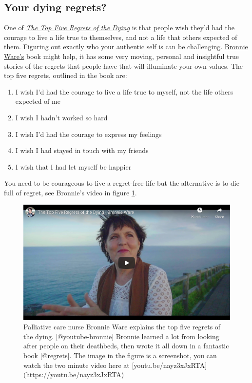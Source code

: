 \documentclass[
]{book}
\providecommand{\tightlist}{%
  \setlength{\itemsep}{0pt}\setlength{\parskip}{0pt}}
\begin{document}
\hypertarget{regret}{%
\subsection{Your dying regrets?}\label{regret}}

One of \emph{\href{https://en.wikipedia.org/wiki/The_Top_Five_Regrets_of_the_Dying}{The Top Five Regrets of the Dying}} \citep{regrets} is that people wish they'd had the courage to live a life true to themselves, and not a life that others expected of them. Figuring out exactly who your authentic self is can be challenging. \href{https://en.wikipedia.org/wiki/Bronnie_Ware}{Bronnie Ware's} book might help, it has some very moving, personal and insightful true stories of the regrets that people have that will illuminate your own values. The top five regrets, outlined in the book are:

\begin{enumerate}
\def\labelenumi{\arabic{enumi}.}
\tightlist
\item
  I wish I'd had the courage to live a life true to myself, not the life others expected of me
\item
  I wish I hadn't worked so hard
\item
  I wish I'd had the courage to express my feelings
\item
  I wish I had stayed in touch with my friends
\item
  I wish that I had let myself be happier
\end{enumerate}

You need to be courageous to live a regret-free life but the alternative is to die full of regret, see Bronnie's video in figure \ref{fig:bronnie-fig}.

\begin{figure}

{\centering \includegraphics[width=0.99\linewidth]{images/youtube-bronnie} 

}

\caption{Palliative care nurse Bronnie Ware explains the top five regrets of the dying. [@youtube-bronnie] Bronnie learned a lot from looking after people on their deathbeds, then wrote it all down in a fantastic book [@regrets]. The image in the figure is a screenshot, you can watch the two minute video here at [youtu.be/nayz3xJxRTA](https://youtu.be/nayz3xJxRTA) }\label{fig:bronnie-fig}
\end{figure}
\end{document}
